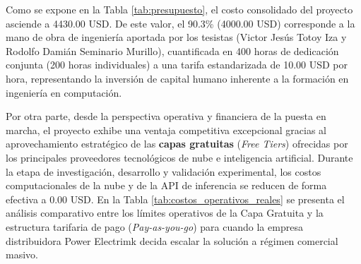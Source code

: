 Como se expone en la Tabla \ref{tab:presupuesto}, el costo consolidado del proyecto asciende a 4430.00 USD. De este valor, el 90.3\% (4000.00 USD) corresponde a la mano de obra de ingeniería aportada por los tesistas (Victor Jesús Totoy Iza y Rodolfo Damián Seminario Murillo), cuantificada en 400 horas de dedicación conjunta (200 horas individuales) a una tarifa estandarizada de 10.00 USD por hora, representando la inversión de capital humano inherente a la formación en ingeniería en computación. 

Por otra parte, desde la perspectiva operativa y financiera de la puesta en marcha, el proyecto exhibe una ventaja competitiva excepcional gracias al aprovechamiento estratégico de las \textbf{capas gratuitas} (\textit{Free Tiers}) ofrecidas por los principales proveedores tecnológicos de nube e inteligencia artificial. Durante la etapa de investigación, desarrollo y validación experimental, los costos computacionales de la nube y de la API de inferencia se reducen de forma efectiva a 0.00 USD. En la Tabla \ref{tab:costos_operativos_reales} se presenta el análisis comparativo entre los límites operativos de la Capa Gratuita y la estructura tarifaria de pago (\textit{Pay-as-you-go}) para cuando la empresa distribuidora Power Electrimk decida escalar la solución a régimen comercial masivo.

